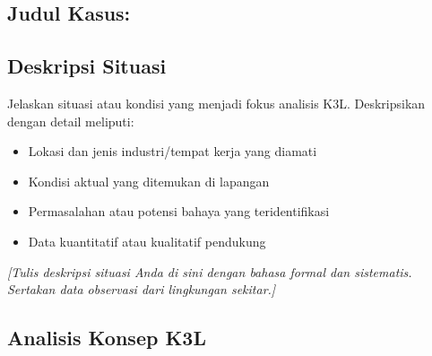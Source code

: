 
\subsection*{Judul Kasus: \underline{\hspace{10cm}}}

\vspace{0.5cm}

\subsection{Deskripsi Situasi}
\label{subsec:deskripsi-situasi}


Jelaskan situasi atau kondisi yang menjadi fokus analisis K3L. Deskripsikan dengan detail meliputi:
\begin{itemize}
    \item Lokasi dan jenis industri/tempat kerja yang diamati
    \item Kondisi aktual yang ditemukan di lapangan
    \item Permasalahan atau potensi bahaya yang teridentifikasi
    \item Data kuantitatif atau kualitatif pendukung
\end{itemize}

\textit{[Tulis deskripsi situasi Anda di sini dengan bahasa formal dan sistematis. Sertakan data observasi dari lingkungan sekitar.]}

\vspace{1cm}

\subsection{Analisis Konsep K3L}
\label{subsec:analisis-konsep}


